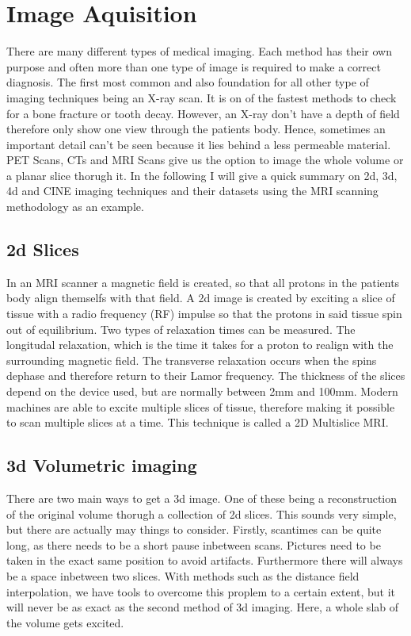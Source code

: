   \section{Image Aquisition}
 \label{Image Aquisition}
 There are many different types of medical imaging. Each method has their own purpose and often more than one type of image is required to make a correct diagnosis. The first most common and also foundation for all other type of imaging techniques being an X-ray scan. It is on of the fastest methods to check for a bone fracture or tooth decay. However,  an X-ray don't have a depth of field therefore only show one view through the patients body. Hence, sometimes an important detail can't be seen because it lies behind a less permeable material. PET Scans, CTs and MRI Scans give us the option to image the whole volume or a planar slice thorugh it. In the following I will give a quick summary on 2d, 3d, 4d and CINE imaging techniques and their datasets using the MRI scanning methodology as an example.

 \subsection{2d Slices}
    \label{2d Slice}
 In an MRI scanner a magnetic field is created, so that all protons in the patients body align themselfs with that field.
A 2d image is created by exciting a slice of tissue with a radio frequency (RF) impulse so that the protons in said tissue spin out of equilibrium. Two types of relaxation times can be measured. The longitudal relaxation, which is the time it takes for a proton to realign with the surrounding magnetic field. The transverse relaxation occurs when the spins dephase and therefore return to their Lamor frequency.
\cite{MagneticResonanceImaging}
\cite{vangeunsBasicPrinciplesMagnetic1999}
The thickness of the slices depend on the device used, but are normally between 2mm and 100mm.
\cite{lineyMRIRadiotherapyPlanning2019}
Modern machines are able to excite multiple slices of tissue, therefore making it possible to scan multiple slices at a time. This technique is called a 2D Multislice MRI.
\cite{johnson2DMultislice3D1999}
\cite{vangeunsBasicPrinciplesMagnetic1999}

  \subsection{3d Volumetric imaging}
  \label{3d Volumetric imaging}
  There are two main ways to get a 3d image. One of these being a reconstruction of the original volume thorugh a collection of 2d slices. This sounds very simple, but there are actually may things to consider. Firstly, scantimes can be quite long, as there needs to be a short pause inbetween scans. Pictures need to be taken in the exact same position to avoid artifacts. Furthermore there will always be a space inbetween two slices. With methods such as the distance field interpolation, we have tools to overcome this proplem to a certain extent, but it will never be as exact as the second method of 3d imaging.
  \cite{vangeunsBasicPrinciplesMagnetic1999}
  Here, a whole slab of the volume gets excited.


